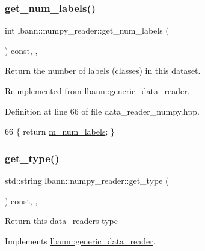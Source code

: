 \subsubsection{\texorpdfstring{get\+\_\+num\+\_\+labels()}{get\_num\_labels()}}
{\footnotesize\ttfamily int lbann\+::numpy\+\_\+reader\+::get\+\_\+num\+\_\+labels (\begin{DoxyParamCaption}{ }\end{DoxyParamCaption}) const\hspace{0.3cm}{\ttfamily [inline]}, {\ttfamily [override]}, {\ttfamily [virtual]}}



Return the number of labels (classes) in this dataset. 



Reimplemented from \hyperlink{classlbann_1_1generic__data__reader_a935ce6262d75f1834e550c3bc16a6547}{lbann\+::generic\+\_\+data\+\_\+reader}.



Definition at line 66 of file data\+\_\+reader\+\_\+numpy.\+hpp.


\begin{DoxyCode}
66 \{ \textcolor{keywordflow}{return} \hyperlink{classlbann_1_1numpy__reader_ab311c3567e1ecc1770a4bc299ab0a3e2}{m\_num\_labels}; \}
\end{DoxyCode}
\mbox{\label{classlbann_1_1numpy__reader_a4c26b0cdc9c5c4b09c127e0ab6a72cf6}} 
\subsubsection{\texorpdfstring{get\+\_\+type()}{get\_type()}}
{\footnotesize\ttfamily std\+::string lbann\+::numpy\+\_\+reader\+::get\+\_\+type (\begin{DoxyParamCaption}{ }\end{DoxyParamCaption}) const\hspace{0.3cm}{\ttfamily [inline]}, {\ttfamily [override]}, {\ttfamily [virtual]}}

Return this data\+\_\+reader\textquotesingle{}s type 

Implements \hyperlink{classlbann_1_1generic__data__reader_abeb849fb8e10b4fa317c90bc33f61758}{lbann\+::generic\+\_\+data\+\_\+reader}.



